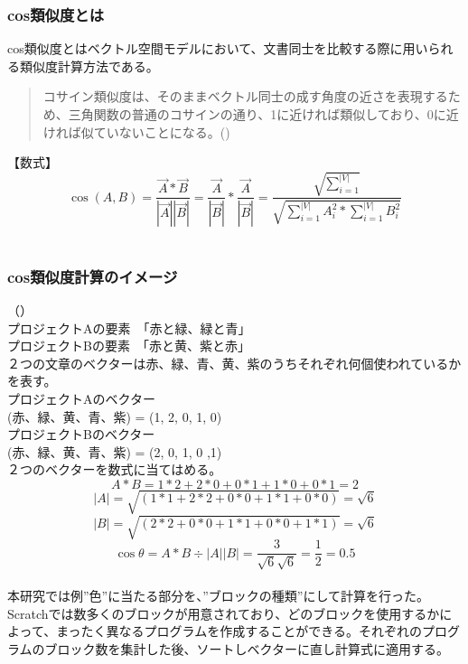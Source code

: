 \documentclass[a4paper,10pt,onecolumn,oneside,openany]{jsbook}
\begin{document}
\subsubsection{cos類似度とは}
cos類似度とはベクトル空間モデルにおいて、文書同士を比較する際に用いられる類似度計算方法である。
\begin{quote}
コサイン類似度は、そのままベクトル同士の成す角度の近さを表現するため、三角関数の普通のコサインの通り、1に近ければ類似しており、0に近ければ似ていないことになる。(\cite{cos})
\end{quote}
【数式】
\begin{equation}
\cos(A,B) = \frac{\vec{A} \ast\vec{B}} {|\vec{A}||\vec{B}|}  = \frac{\vec{A}}{|\vec{B}|}\ast\frac{\vec{A}}{|\vec{B}|} = \frac{\sqrt {\sum_{i=1}^{|V|}}}{\sqrt{\sum_{i=1}^{|V|}A_i^2\ast\sum_{i=1}^{|V|}B_i^2}}
\end{equation}
\\
\subsubsection{cos類似度計算のイメージ}（\cite{tf_idf_cos}）
\\プロジェクトAの要素　「赤と緑、緑と青」
\\プロジェクトBの要素　「赤と黄、紫と赤」
\\２つの文章のベクターは赤、緑、青、黄、紫のうちそれぞれ何個使われているかを表す。
\\プロジェクトAのベクター
\\(赤、緑、黄、青、紫) = (1, 2, 0, 1, 0)
\\プロジェクトBのベクター
\\(赤、緑、黄、青、紫) = (2, 0, 1, 0 ,1)
\\２つのベクターを数式に当てはめる。
\begin{equation}
A \ast B = 1 \ast 2 + 2 \ast 0 + 0 \ast 1 + 1 \ast 0 + 0 \ast 1 = 2
\end{equation}
\begin{equation}
|A| = \sqrt{( 1 \ast 1 + 2 \ast 2 + 0 \ast 0 + 1 \ast 1 + 0 \ast 0 )} = \sqrt{6}
\end{equation}
\begin{equation}
|B| = \sqrt{( 2 \ast 2 + 0 \ast 0 + 1 \ast 1 + 0 \ast 0 + 1 \ast 1 )} = \sqrt{6}
\end{equation}
\begin{equation}
\cos\theta = A \ast B \div |A| |B| = \frac{3}{\sqrt{6}\sqrt{6}} = \frac{1}{2} = 0.5
\end{equation}
\\本研究では例”色”に当たる部分を、”ブロックの種類”にして計算を行った。Scratchでは数多くのブロックが用意されており、どのブロックを使用するかによって、まったく異なるプログラムを作成することができる。それぞれのプログラムのブロック数を集計した後、ソートしベクターに直し計算式に適用する。
\end{document}
